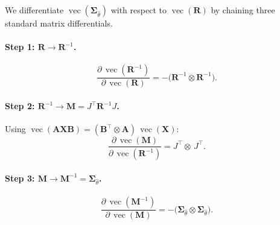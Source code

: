 \documentclass[11pt]{article}
\newcommand{\vect}{\operatorname{vec}}
\begin{document}
We differentiate $\vect(\boldsymbol{\Sigma}_{\hat\theta})$ with respect to
$\vect(\mathbf{R})$ by chaining three standard matrix differentials.

\paragraph{Step 1: $\mathbf{R} \to \mathbf{R}^{-1}$.}
\begin{equation}
  \frac{\partial\,\vect(\mathbf{R}^{-1})}
       {\partial\,\vect(\mathbf{R})}
    = -\bigl(\mathbf{R}^{-1} \otimes \mathbf{R}^{-1}\bigr).
\end{equation}

\paragraph{Step 2: $\mathbf{R}^{-1} \to
  \mathbf{M} = J^\top \mathbf{R}^{-1} J$.}
Using $\vect(\mathbf{A}\mathbf{X}\mathbf{B})
= (\mathbf{B}^\top \!\otimes \mathbf{A})\,\vect(\mathbf{X})$:
\begin{equation}
  \frac{\partial\,\vect(\mathbf{M})}
       {\partial\,\vect(\mathbf{R}^{-1})}
    = J^\top \!\otimes\, J^\top.
\end{equation}

\paragraph{Step 3: $\mathbf{M} \to
  \mathbf{M}^{-1} = \boldsymbol{\Sigma}_{\hat\theta}$.}
\begin{equation}
  \frac{\partial\,\vect(\mathbf{M}^{-1})}
       {\partial\,\vect(\mathbf{M})}
    = -\bigl(\boldsymbol{\Sigma}_{\hat\theta}
        \otimes \boldsymbol{\Sigma}_{\hat\theta}\bigr).
\end{equation}
\end{document}
